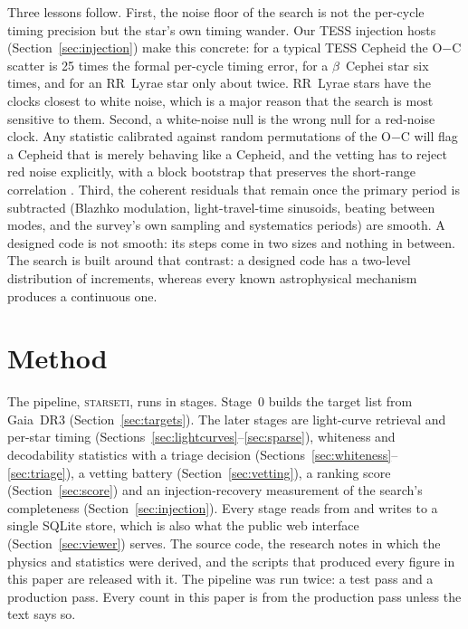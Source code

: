 \documentclass[final,5p]{elsarticle}
\newcommand{\oc}{O$-$C}
\newcommand{\starseti}{\textsc{starseti}}
\newcommand{\bcep}{\ensuremath{\beta}~Cephei}
\begin{document}
Three lessons follow. First, the noise floor of the search is not the per-cycle timing precision but the star's own timing wander. Our TESS injection hosts (Section~\ref{sec:injection}) make this concrete: for a typical TESS Cepheid the \oc{} scatter is 25 times the formal per-cycle timing error, for a \bcep{} star six times, and for an RR~Lyrae star only about twice. RR~Lyrae stars have the clocks closest to white noise, which is a major reason that the search is most sensitive to them. Second, a white-noise null is the wrong null for a red-noise clock. Any statistic calibrated against random permutations of the \oc{} will flag a Cepheid that is merely behaving like a Cepheid, and the vetting has to reject red noise explicitly, with a block bootstrap that preserves the short-range correlation \citep{Kunsch1989}. Third, the coherent residuals that remain once the primary period is subtracted (Blazhko modulation, light-travel-time sinusoids, beating between modes, and the survey's own sampling and systematics periods) are smooth. A designed code is not smooth: its steps come in two sizes and nothing in between. The search is built around that contrast: a designed code has a two-level distribution of increments, whereas every known astrophysical mechanism produces a continuous one.

\section{Method}
\label{sec:method}

The pipeline, \starseti{}, runs in stages. Stage~0 builds the target list from Gaia~DR3 (Section~\ref{sec:targets}). The later stages are light-curve retrieval and per-star timing (Sections~\ref{sec:lightcurves}--\ref{sec:sparse}), whiteness and decodability statistics with a triage decision (Sections~\ref{sec:whiteness}--\ref{sec:triage}), a vetting battery (Section~\ref{sec:vetting}), a ranking score (Section~\ref{sec:score}) and an injection-recovery measurement of the search's completeness (Section~\ref{sec:injection}). Every stage reads from and writes to a single SQLite store, which is also what the public web interface (Section~\ref{sec:viewer}) serves. The source code, the research notes in which the physics and statistics were derived, and the scripts that produced every figure in this paper are released with it. The pipeline was run twice: a test pass and a production pass. Every count in this paper is from the production pass unless the text says so.
\end{document}
